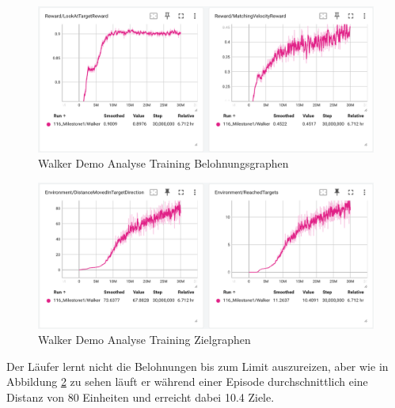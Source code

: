 \begin{figure}[H]
  \centering  
  \includegraphics[scale=0.5]{img/analyse_training_belohnung.png}
  \caption{Walker Demo Analyse Training Belohnungsgraphen}
  \label{fig:analyse_training_belohnung}
\end{figure}

\begin{figure}[H]
  \centering  
  \includegraphics[scale=0.5]{img/analyse_training2.png}
  \caption{Walker Demo Analyse Training Zielgraphen}
  \label{fig:analyse_training_2}
\end{figure}

Der Läufer lernt nicht die Belohnungen bis zum Limit auszureizen, aber wie in Abbildung \ref{fig:analyse_training_2} zu sehen läuft er während einer Episode durchschnittlich eine Distanz von 80 Einheiten und erreicht dabei 10.4 Ziele.